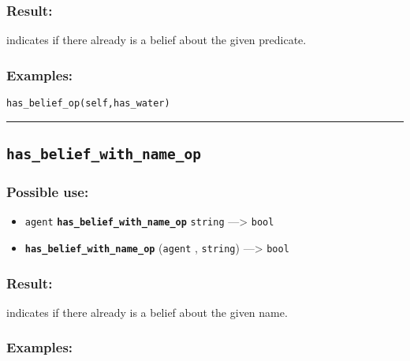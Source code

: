 \documentclass[]{book}
\providecommand{\tightlist}{%
  \setlength{\itemsep}{0pt}\setlength{\parskip}{0pt}}
\theoremstyle{definition}
\theoremstyle{definition}
\theoremstyle{definition}
\theoremstyle{remark}
\begin{document}
\subsubsection{Result:}\label{result-237}

indicates if there already is a belief about the given predicate.

\subsubsection{Examples:}\label{examples-186}

\begin{verbatim}
has_belief_op(self,has_water) 
\end{verbatim}

\begin{center}\rule{0.5\linewidth}{\linethickness}\end{center}

\subsection{\texorpdfstring{\texttt{has\_belief\_with\_name\_op}}{has\_belief\_with\_name\_op}}\label{has_belief_with_name_op}

\subsubsection{Possible use:}\label{possible-use-247}

\begin{itemize}
\tightlist
\item
  \texttt{agent} \textbf{\texttt{has\_belief\_with\_name\_op}}
  \texttt{string} ---\textgreater{} \texttt{bool}
\item
  \textbf{\texttt{has\_belief\_with\_name\_op}} (\texttt{agent} ,
  \texttt{string}) ---\textgreater{} \texttt{bool}
\end{itemize}

\subsubsection{Result:}\label{result-238}

indicates if there already is a belief about the given name.

\subsubsection{Examples:}\label{examples-187}
\end{document}
